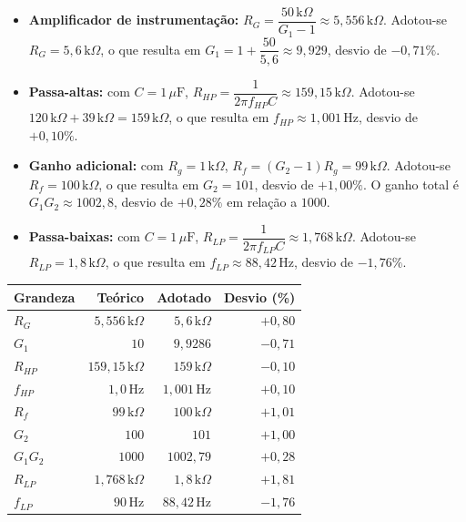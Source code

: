 \documentclass[11pt,a4paper]{article}
\begin{document}
\begin{itemize}
    \item \textbf{Amplificador de instrumentação:} $R_G=\dfrac{50\,\text{k}\Omega}{G_1-1}\approx5{,}556\,\text{k}\Omega$. Adotou-se $R_G=5{,}6\,\text{k}\Omega$, o que resulta em $G_1=1+\dfrac{50}{5{,}6}\approx9{,}929$, desvio de $-0{,}71\%$.

    \item \textbf{Passa-altas:} com $C=1\,\mu\text{F}$, $R_{HP}=\dfrac{1}{2\pi f_{HP}C}\approx159{,}15\,\text{k}\Omega$. Adotou-se $120\,\text{k}\Omega+39\,\text{k}\Omega=159\,\text{k}\Omega$, o que resulta em $f_{HP}\approx1{,}001\,\text{Hz}$, desvio de $+0{,}10\%$.

    \item \textbf{Ganho adicional:} com $R_g=1\,\text{k}\Omega$, $R_f=(G_2-1)R_g=99\,\text{k}\Omega$. Adotou-se $R_f=100\,\text{k}\Omega$, o que resulta em $G_2=101$, desvio de $+1{,}00\%$. O ganho total é $G_1G_2\approx1002{,}8$, desvio de $+0{,}28\%$ em relação a $1000$.

    \item \textbf{Passa-baixas:} com $C=1\,\mu\text{F}$, $R_{LP}=\dfrac{1}{2\pi f_{LP}C}\approx1{,}768\,\text{k}\Omega$. Adotou-se $R_{LP}=1{,}8\,\text{k}\Omega$, o que resulta em $f_{LP}\approx88{,}42\,\text{Hz}$, desvio de $-1{,}76\%$.
\end{itemize}

\begin{center}
\begin{tabular}{@{}lrrr@{}}
\toprule
\textbf{Grandeza} & \textbf{Teórico} & \textbf{Adotado} &
\textbf{Desvio (\%)} \\
\midrule
\(R_G\) & \(5{,}556\,\text{k}\Omega\) &
\(5{,}6\,\text{k}\Omega\) & \(+0{,}80\) \\
\(G_1\) & \(10\) & \(9{,}9286\) & \(-0{,}71\) \\
\(R_{HP}\) & \(159{,}15\,\text{k}\Omega\) &
\(159\,\text{k}\Omega\) & \(-0{,}10\) \\
\(f_{HP}\) & \(1{,}0\,\text{Hz}\) &
\(1{,}001\,\text{Hz}\) & \(+0{,}10\) \\
\(R_f\) & \(99\,\text{k}\Omega\) &
\(100\,\text{k}\Omega\) & \(+1{,}01\) \\
\(G_2\) & \(100\) & \(101\) & \(+1{,}00\) \\
\(G_1G_2\) & \(1000\) & \(1002{,}79\) & \(+0{,}28\) \\
\(R_{LP}\) & \(1{,}768\,\text{k}\Omega\) &
\(1{,}8\,\text{k}\Omega\) & \(+1{,}81\) \\
\(f_{LP}\) & \(90\,\text{Hz}\) &
\(88{,}42\,\text{Hz}\) & \(-1{,}76\) \\
\bottomrule
\end{tabular}
\end{center}
\end{document}
